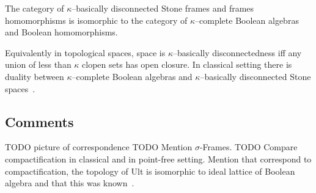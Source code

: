 \begin{theorem}
    The category of $\kappa$--basically disconnected Stone frames and frames homomorphisms is isomorphic to the category of $\kappa$--complete Boolean algebras and Boolean homomorphisms.
\end{theorem}

Equivalently in topological spaces, space is $\kappa$--basically disconnectedness iff any union of less than $\kappa$ clopen sets has open closure. In classical setting there is duality between $\kappa$--complete Boolean algebras and $\kappa$--basically disconnected Stone spaces~\cite{monk1989handbook}.

\subsection*{Comments}
TODO picture of correspondence
TODO Mention $\sigma$-Frames.
TODO Compare compactification in classical and in point-free setting. Mention that \J{} correspond to compactification, the topology of Ult is isomorphic to ideal lattice of Boolean algebra and that this was known~\cite{monk1989handbook}.
